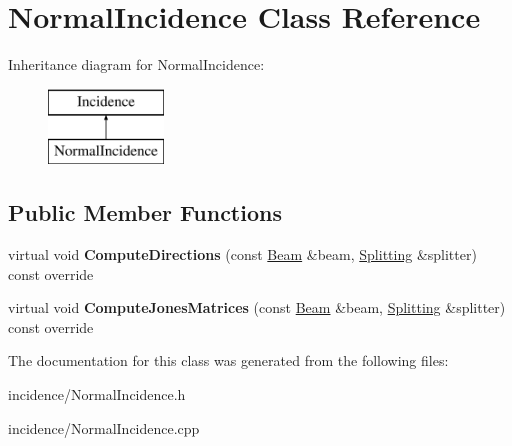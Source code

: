 \hypertarget{class_normal_incidence}{}\section{Normal\+Incidence Class Reference}
\label{class_normal_incidence}
Inheritance diagram for Normal\+Incidence\+:\begin{figure}[H]
\begin{center}
\leavevmode
\includegraphics[height=2.000000cm]{class_normal_incidence}
\end{center}
\end{figure}
\subsection*{Public Member Functions}
\begin{DoxyCompactItemize}
\item 
\mbox{\label{class_normal_incidence_a0e02aa34d04670aa431a88dcc6016c36}} 
virtual void {\bfseries Compute\+Directions} (const \mbox{\hyperlink{class_beam}{Beam}} \&beam, \mbox{\hyperlink{class_splitting}{Splitting}} \&splitter) const override
\item 
\mbox{\label{class_normal_incidence_acc09bec130f6d1dfea67afd729c41567}} 
virtual void {\bfseries Compute\+Jones\+Matrices} (const \mbox{\hyperlink{class_beam}{Beam}} \&beam, \mbox{\hyperlink{class_splitting}{Splitting}} \&splitter) const override
\end{DoxyCompactItemize}


The documentation for this class was generated from the following files\+:\begin{DoxyCompactItemize}
\item 
incidence/Normal\+Incidence.\+h\item 
incidence/Normal\+Incidence.\+cpp\end{DoxyCompactItemize}
